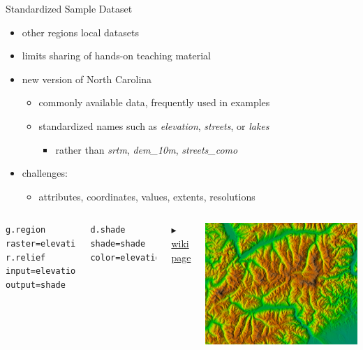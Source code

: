 \documentclass[xcolor={dvipsnames,usenames},beamer]{beamer}
\begin{document}
\begin{frame}[fragile]{Standardized Sample Dataset}

\begin{itemize}
 \item other regions local datasets
 \item limits sharing of hands-on teaching material
 \item new version of North Carolina
 \begin{itemize}
  \item commonly available data, frequently used in examples
  \item standardized names such as \textit{elevation}, \textit{streets}, or \textit{lakes}
  \begin{itemize}
   \item rather than \textit{srtm}, \textit{dem\_10m}, \textit{streets\_como}
  \end{itemize}
 \end{itemize}
 \item challenges:
 \begin{itemize}
  \item attributes, coordinates, values, extents, resolutions
 \end{itemize}

\end{itemize}

\bigskip

\begin{columns}[c]

\scriptsize
\begin{verbatim}
g.region raster=elevation
r.relief input=elevation output=shade
\end{verbatim}
\begin{verbatim}
d.shade shade=shade color=elevation
\end{verbatim}
\medskip
\hfill
\href{http://grasswiki.osgeo.org/wiki/GRASS_GIS_Standardized_Sample_Datasets}{%
$\blacktriangleright$ wiki page}

 \includegraphics[width=\textwidth]{./images/dataset/std_dataset_piemonte_shaded_elevation}%
\end{columns}



\end{frame}
\end{document}
